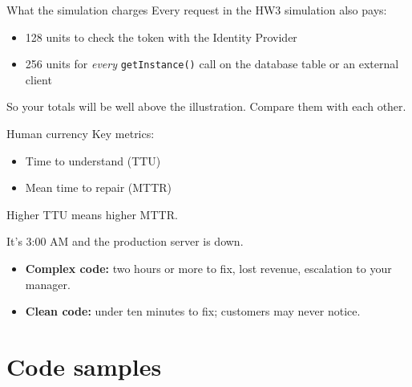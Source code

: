 \documentclass[aspectratio=169]{beamer}
\begin{document}
\begin{frame}{What the simulation charges}
  Every request in the HW3 simulation also pays:
  \begin{itemize}
    \item 128 units to check the token with the Identity Provider
    \item 256 units for \emph{every} \texttt{getInstance()} call on the database table or an
      external client
  \end{itemize}
  So your totals will be well above the illustration. Compare them with each other.
\end{frame}

\begin{frame}{Human currency}
  Key metrics:
  \begin{itemize}
    \item Time to understand (TTU)
    \item Mean time to repair (MTTR)
  \end{itemize}
  Higher TTU means higher MTTR.
  \pause

  \medskip
  It's 3:00 AM and the production server is down.
  \begin{itemize}
    \item \textbf{Complex code:} two hours or more to fix, lost revenue, escalation to your
      manager.
    \item \textbf{Clean code:} under ten minutes to fix; customers may never notice.
  \end{itemize}
\end{frame}

\section{Code samples}
\end{document}
